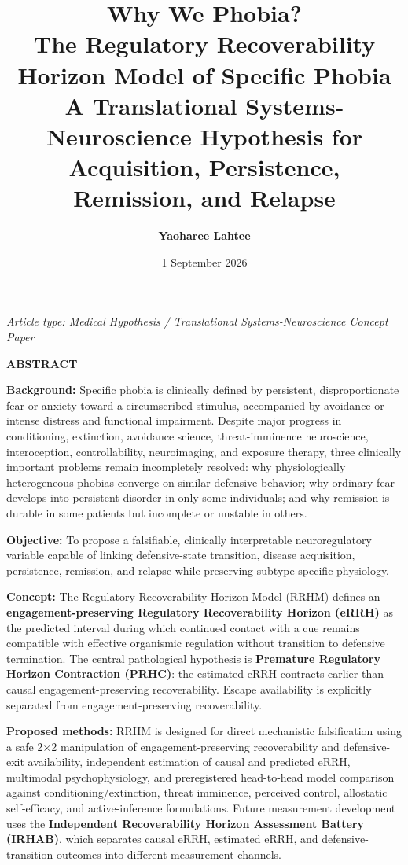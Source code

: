 \documentclass[9pt,twocolumn]{article}
\title{\vspace{-1.2em}
{\sffamily\bfseries\fontsize{19}{21}\selectfont\color{RRHMNavy} Why We Phobia?}\\[0.38em]
{\sffamily\bfseries\fontsize{12.2}{14}\selectfont The Regulatory Recoverability Horizon Model of Specific Phobia}\\[0.22em]
{\sffamily\fontsize{9.3}{11}\selectfont\color{RRHMSlate} A Translational Systems-Neuroscience Hypothesis for Acquisition, Persistence, Remission, and Relapse}}
\author{\sffamily\bfseries Yaoharee Lahtee}
\date{\sffamily\small 1 September 2026}
\renewenvironment{abstract}
{\small\noindent\textsf{\bfseries\color{RRHMNavy}ABSTRACT}\par\smallskip\noindent}
{\par\vspace{0.5em}}
\begin{document}
\maketitle

\begin{center}
\textit{Article type: Medical Hypothesis / Translational Systems-Neuroscience Concept Paper}
\end{center}

\begin{strip}\begin{abstract}
\textbf{Background:} Specific phobia is clinically defined by persistent, disproportionate fear or anxiety toward a circumscribed stimulus, accompanied by avoidance or intense distress and functional impairment. Despite major progress in conditioning, extinction, avoidance science, threat-imminence neuroscience, interoception, controllability, neuroimaging, and exposure therapy, three clinically important problems remain incompletely resolved: why physiologically heterogeneous phobias converge on similar defensive behavior; why ordinary fear develops into persistent disorder in only some individuals; and why remission is durable in some patients but incomplete or unstable in others.

\textbf{Objective:} To propose a falsifiable, clinically interpretable neuroregulatory variable capable of linking defensive-state transition, disease acquisition, persistence, remission, and relapse while preserving subtype-specific physiology.

\textbf{Concept:} The Regulatory Recoverability Horizon Model (RRHM) defines an \textbf{engagement-preserving Regulatory Recoverability Horizon (eRRH)} as the predicted interval during which continued contact with a cue remains compatible with effective organismic regulation without transition to defensive termination. The central pathological hypothesis is \textbf{Premature Regulatory Horizon Contraction (PRHC)}: the estimated eRRH contracts earlier than causal engagement-preserving recoverability. Escape availability is explicitly separated from engagement-preserving recoverability.

\textbf{Proposed methods:} RRHM is designed for direct mechanistic falsification using a safe 2$\times$2 manipulation of engagement-preserving recoverability and defensive-exit availability, independent estimation of causal and predicted eRRH, multimodal psychophysiology, and preregistered head-to-head model comparison against conditioning/extinction, threat imminence, perceived control, allostatic self-efficacy, and active-inference formulations. Future measurement development uses the \textbf{Independent Recoverability Horizon Assessment Battery (IRHAB)}, which separates causal eRRH, estimated eRRH, and defensive-transition outcomes into different measurement channels.


\end{abstract}
\end{strip}
\end{document}
